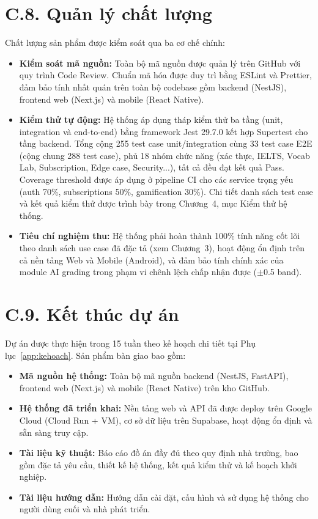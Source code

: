 \section*{C.8. Quản lý chất lượng}

Chất lượng sản phẩm được kiểm soát qua ba cơ chế chính:

\begin{itemize}
    \item \textbf{Kiểm soát mã nguồn:} Toàn bộ mã nguồn được quản lý trên GitHub với quy trình Code Review. Chuẩn mã hóa được duy trì bằng ESLint và Prettier, đảm bảo tính nhất quán trên toàn bộ codebase gồm backend (NestJS), frontend web (Next.js) và mobile (React Native).

    \item \textbf{Kiểm thử tự động:} Hệ thống áp dụng tháp kiểm thử ba tầng (unit, integration và end-to-end) bằng framework Jest 29.7.0 kết hợp Supertest cho tầng backend. Tổng cộng 255 test case unit/integration cùng 33 test case E2E (cộng chung 288 test case), phủ 18 nhóm chức năng (xác thực, IELTS, Vocab Lab, Subscription, Edge case, Security...), tất cả đều đạt kết quả Pass. Coverage threshold được áp dụng ở pipeline CI cho các service trọng yếu (auth 70\%, subscriptions 50\%, gamification 30\%). Chi tiết danh sách test case và kết quả kiểm thử được trình bày trong Chương~4, mục Kiểm thử hệ thống.

    \item \textbf{Tiêu chí nghiệm thu:} Hệ thống phải hoàn thành 100\% tính năng cốt lõi theo danh sách use case đã đặc tả (xem Chương~3), hoạt động ổn định trên cả nền tảng Web và Mobile (Android), và đảm bảo tính chính xác của module AI grading trong phạm vi chênh lệch chấp nhận được ($\pm$0.5 band).
\end{itemize}

\section*{C.9. Kết thúc dự án}

Dự án được thực hiện trong 15 tuần theo kế hoạch chi tiết tại Phụ lục~\ref{app:kehoach}. Sản phẩm bàn giao bao gồm:

\begin{itemize}
    \item \textbf{Mã nguồn hệ thống:} Toàn bộ mã nguồn backend (NestJS, FastAPI), frontend web (Next.js) và mobile (React Native) trên kho GitHub.
    \item \textbf{Hệ thống đã triển khai:} Nền tảng web và API đã được deploy trên Google Cloud (Cloud Run + VM), cơ sở dữ liệu trên Supabase, hoạt động ổn định và sẵn sàng truy cập.
    \item \textbf{Tài liệu kỹ thuật:} Báo cáo đồ án đầy đủ theo quy định nhà trường, bao gồm đặc tả yêu cầu, thiết kế hệ thống, kết quả kiểm thử và kế hoạch khởi nghiệp.
    \item \textbf{Tài liệu hướng dẫn:} Hướng dẫn cài đặt, cấu hình và sử dụng hệ thống cho người dùng cuối và nhà phát triển.
\end{itemize}

